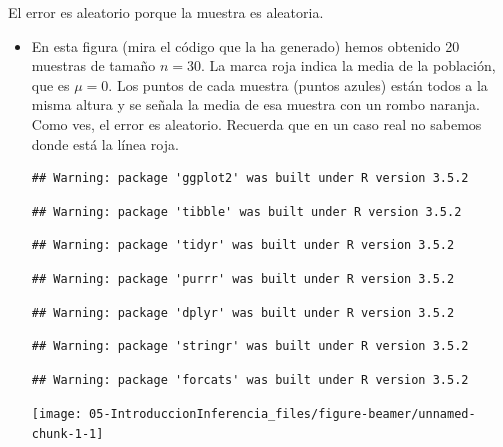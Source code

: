 \documentclass[
  9pt,
  ignorenonframetext,
]{beamer}
\begin{document}
\begin{frame}[fragile]{El error es aleatorio porque la muestra es
aleatoria.}
\protect\hypertarget{el-error-es-aleatorio-porque-la-muestra-es-aleatoria.}{}

\begin{itemize}
\item
  En esta figura (mira el código que la ha generado) hemos obtenido 20
  muestras de tamaño \(n = 30\). La marca roja indica la media de la
  población, que es \(\mu =0\). Los puntos de cada muestra (puntos
  azules) están todos a la misma altura y se señala la media de esa
  muestra con un rombo naranja. Como ves, el error es aleatorio.
  Recuerda que en un caso real no sabemos donde está la línea roja.

\begin{verbatim}
## Warning: package 'ggplot2' was built under R version 3.5.2
\end{verbatim}

\begin{verbatim}
## Warning: package 'tibble' was built under R version 3.5.2
\end{verbatim}

\begin{verbatim}
## Warning: package 'tidyr' was built under R version 3.5.2
\end{verbatim}

\begin{verbatim}
## Warning: package 'purrr' was built under R version 3.5.2
\end{verbatim}

\begin{verbatim}
## Warning: package 'dplyr' was built under R version 3.5.2
\end{verbatim}

\begin{verbatim}
## Warning: package 'stringr' was built under R version 3.5.2
\end{verbatim}

\begin{verbatim}
## Warning: package 'forcats' was built under R version 3.5.2
\end{verbatim}

  \begin{center}\texttt{[image: 05-IntroduccionInferencia\_files/figure-beamer/unnamed-chunk-1-1]} \end{center}
\end{itemize}

\end{frame}
\end{document}

